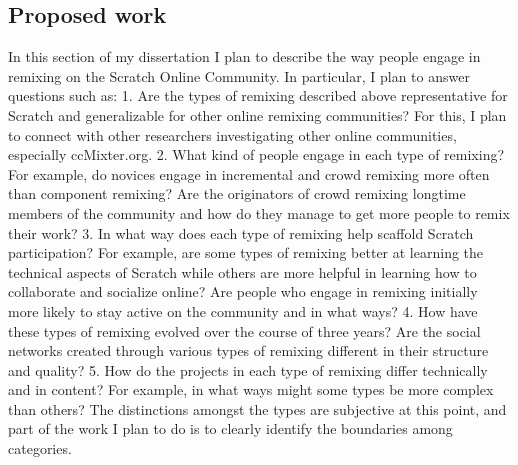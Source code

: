 \subsection{Proposed work}
In this section of my dissertation I plan to describe the way people engage in remixing on the Scratch Online Community. 
In particular, I plan to answer questions such as:
1. Are the types of remixing described above representative for Scratch and generalizable for other online remixing communities? 
For this, I plan to connect with other researchers investigating other online communities, especially ccMixter.org.
2. What kind of people engage in each type of remixing? For example, do novices engage in incremental and crowd remixing more often than component remixing? Are the originators of crowd remixing longtime members of the community and how do they manage to get more people to remix their work?
3. In what way does each type of remixing help scaffold Scratch participation? For example, are some types of remixing better at learning the technical aspects of Scratch while others are more helpful in learning how to collaborate and socialize online? Are people who engage in remixing initially more likely to stay active on the community and in what ways?
4. How have these types of remixing evolved over the course of three years?
Are the social networks created through various types of remixing different in their structure and quality?
5. How do the projects in each type of remixing differ technically and in content? For example, in what ways might some types be more complex than others?
The distinctions amongst the types are subjective at this point, and part of the work I plan to do is to clearly identify the boundaries among categories.


